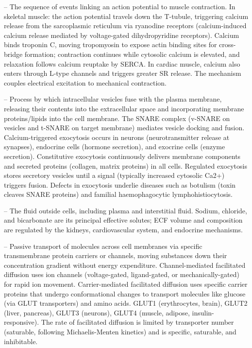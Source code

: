 -- The sequence of events linking an action potential to muscle contraction. In skeletal muscle: the action potential travels down the T-tubule, triggering calcium release from the sarcoplasmic reticulum via ryanodine receptors (calcium-induced calcium release mediated by voltage-gated dihydropyridine receptors). Calcium binds troponin C, moving tropomyosin to expose actin binding sites for cross-bridge formation; contraction continues while cytosolic calcium is elevated, and relaxation follows calcium reuptake by SERCA. In cardiac muscle, calcium also enters through L-type channels and triggers greater SR release. The mechanism couples electrical excitation to mechanical contraction.

-- Process by which intracellular vesicles fuse with the plasma membrane, releasing their contents into the extracellular space and incorporating membrane proteins/lipids into the cell membrane. The SNARE complex (v-SNARE on vesicles and t-SNARE on target membrane) mediates vesicle docking and fusion. Calcium-triggered exocytosis occurs in neurons (neurotransmitter release at synapses), endocrine cells (hormone secretion), and exocrine cells (enzyme secretion). Constitutive exocytosis continuously delivers membrane components and secreted proteins (collagen, matrix proteins) in all cells. Regulated exocytosis stores secretory vesicles until a signal (typically increased cytosolic Ca2+) triggers fusion. Defects in exocytosis underlie diseases such as botulism (toxin cleaves SNARE proteins) and familial haemophagocytic lymphohistiocytosis.

-- The fluid outside cells, including plasma and interstitial fluid. Sodium, chloride, and bicarbonate are its principal effective solutes; ECF volume and composition are regulated by the kidneys, cardiovascular system, and endocrine mechanisms.

-- Passive transport of molecules across cell membranes via specific transmembrane protein carriers or channels, moving substances down their concentration gradient without energy expenditure. Channel-mediated facilitated diffusion uses ion channels (voltage-gated, ligand-gated, or mechanically-gated) for rapid ion movement. Carrier-mediated facilitated diffusion uses specific carrier proteins that undergo conformational changes to transport molecules like glucose (via GLUT transporters) and amino acids. GLUT1 (erythrocytes, brain), GLUT2 (liver, pancreas), GLUT3 (neurons), GLUT4 (muscle, adipose, insulin-responsive). The rate of facilitated diffusion is limited by transporter number (saturable, following Michaelis-Menten kinetics) and is specific, saturable, and inhibitable.

